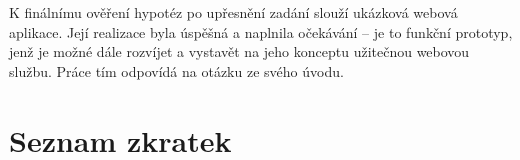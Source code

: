 \documentclass[12pt,oneside,final]{fithesis2}
\begin{document}
K finálnímu ověření hypotéz po upřesnění zadání slouží ukázková webová aplikace. Její realizace byla úspěšná a naplnila očekávání -- je to funkční prototyp, jenž je možné dále rozvíjet a vystavět na jeho konceptu užitečnou webovou službu. Práce tím odpovídá na otázku ze svého úvodu.





\begin{flushleft}
\end{flushleft}



\appendix
\chapter{Seznam zkratek}\label{abbrs}
\end{document}
